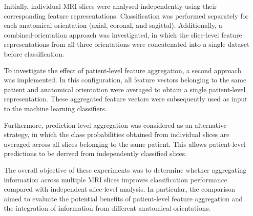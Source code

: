 Initially, individual MRI slices were analysed independently using their corresponding feature representations. Classification was performed separately for each anatomical orientation (axial, coronal, and sagittal). Additionally, a combined-orientation approach was investigated, in which the slice-level feature representations from all three orientations were concatenated into a single dataset before classification.

To investigate the effect of patient-level feature aggregation, a second approach was implemented. In this configuration, all feature vectors belonging to the same patient and anatomical orientation were averaged to obtain a single patient-level representation. These aggregated feature vectors were subsequently used as input to the machine learning classifiers.

Furthermore, prediction-level aggregation was considered as an alternative strategy, in which the class probabilities obtained from individual slices are averaged across all slices belonging to the same patient. This allows patient-level predictions to be derived from independently classified slices.

The overall objective of these experiments was to determine whether aggregating information across multiple MRI slices improves classification performance compared with independent slice-level analysis. In particular, the comparison aimed to evaluate the potential benefits of patient-level feature aggregation and the integration of information from different anatomical orientations.


